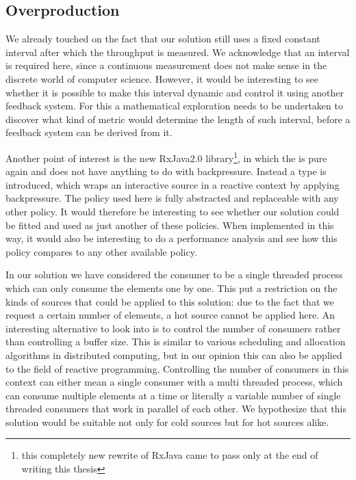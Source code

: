 \subsection*{Overproduction}
We already touched on the fact that our solution still uses a fixed constant interval after which the throughput is measured. We acknowledge that an interval is required here, since a continuous measurement does not make sense in the discrete world of computer science. However, it would be interesting to see whether it is possible to make this interval dynamic and control it using another feedback system. For this a mathematical exploration needs to be undertaken to discover what kind of metric would determine the length of such interval, before a feedback system can be derived from it.

Another point of interest is the new RxJava2.0 library\footnote{this completely new rewrite of RxJava came to pass only at the end of writing this thesis}, in which the \obs is pure again and does not have anything to do with backpressure. Instead a  type is introduced, which wraps an interactive source in a reactive context by applying backpressure. The policy used here is fully abstracted and replaceable with any other policy. It would therefore be interesting to see whether our solution could be fitted and used as just another of these policies. When implemented in this way, it would also be interesting to do a performance analysis and see how this policy compares to any other available policy.

In our solution we have considered the consumer to be a single threaded process which can only consume the elements one by one. This put a restriction on the kinds of sources that could be applied to this solution: due to the fact that we request a certain number of elements, a hot source cannot be applied here. An interesting alternative to look into is to control the number of consumers rather than controlling a buffer size. This is similar to various scheduling and allocation algorithms in distributed computing, but in our opinion this can also be applied to the field of reactive programming. Controlling the number of consumers in this context can either mean a single consumer with a multi threaded process, which can consume multiple elements at a time or literally a variable number of single threaded consumers that work in parallel of each other. We hypothesize that this solution would be suitable not only for cold sources but for hot sources alike.

